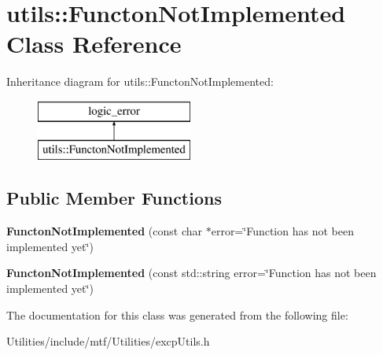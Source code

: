 \hypertarget{classutils_1_1FunctonNotImplemented}{\section{utils\-:\-:Functon\-Not\-Implemented Class Reference}
\label{classutils_1_1FunctonNotImplemented}
}
Inheritance diagram for utils\-:\-:Functon\-Not\-Implemented\-:\begin{figure}[H]
\begin{center}
\leavevmode
\includegraphics[height=2.000000cm]{classutils_1_1FunctonNotImplemented}
\end{center}
\end{figure}
\subsection*{Public Member Functions}
\begin{DoxyCompactItemize}
\item 
\hypertarget{classutils_1_1FunctonNotImplemented_a59e04ef4b1a20a63b73df7ac9857e6e7}{{\bfseries Functon\-Not\-Implemented} (const char $\ast$error=\char`\"{}Function has not been implemented yet\char`\"{})}\label{classutils_1_1FunctonNotImplemented_a59e04ef4b1a20a63b73df7ac9857e6e7}

\item 
\hypertarget{classutils_1_1FunctonNotImplemented_a2dd8da4f1b1bf70aece415f1d4854693}{{\bfseries Functon\-Not\-Implemented} (const std\-::string error=\char`\"{}Function has not been implemented yet\char`\"{})}\label{classutils_1_1FunctonNotImplemented_a2dd8da4f1b1bf70aece415f1d4854693}

\end{DoxyCompactItemize}


The documentation for this class was generated from the following file\-:\begin{DoxyCompactItemize}
\item 
Utilities/include/mtf/\-Utilities/excp\-Utils.\-h\end{DoxyCompactItemize}
